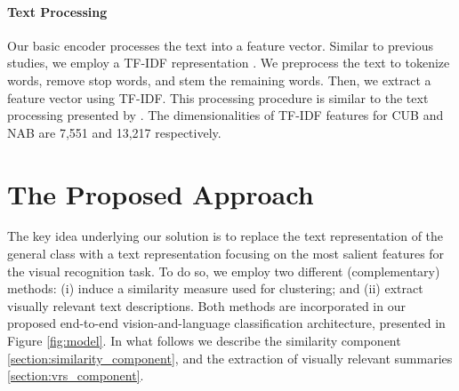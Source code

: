 \documentclass[11pt,a4paper]{article}
\newcommand\yuval[1]{\textcolor{darkpink}{\textbf{YUVAL:} #1 }}
\begin{document}


\paragraph{Text Processing}
\label{section:Text_Encoder}
Our basic encoder processes the text into a feature vector. Similar to previous studies, we employ a TF-IDF representation \citep{salton1988term}. %
We preprocess the text to tokenize words, remove stop words, and stem the remaining words. Then, we extract a feature vector using TF-IDF. This processing procedure is similar to the text processing presented by \citet{zhu2018generative}.
The dimensionalities of TF-IDF features for CUB and NAB are 7,551 and 13,217 respectively. 

\section{The Proposed Approach}
\label{sections:ZEST}
The key idea underlying our solution is to replace the text representation of the general class with a text representation focusing on the most salient features for the visual recognition task.
To do so, we employ two different (complementary) methods: (i) induce a similarity measure used for clustering; and (ii) extract visually relevant text descriptions. Both methods are incorporated in our proposed end-to-end vision-and-language classification architecture, presented in Figure \ref{fig:model}. In what follows we describe the similarity component \ref{section:similarity_component}, and the extraction of visually relevant summaries \ref{section:vrs_component}.
\end{document}
